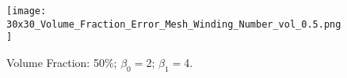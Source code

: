\begin{figure}
\texttt{[image: 30x30\_Volume\_Fraction\_Error\_Mesh\_Winding\_Number\_vol\_0.5.png]}
\caption{Volume Fraction: 50\%; $\beta_0 = $2; $\beta_1 = $4.}
\end{figure}